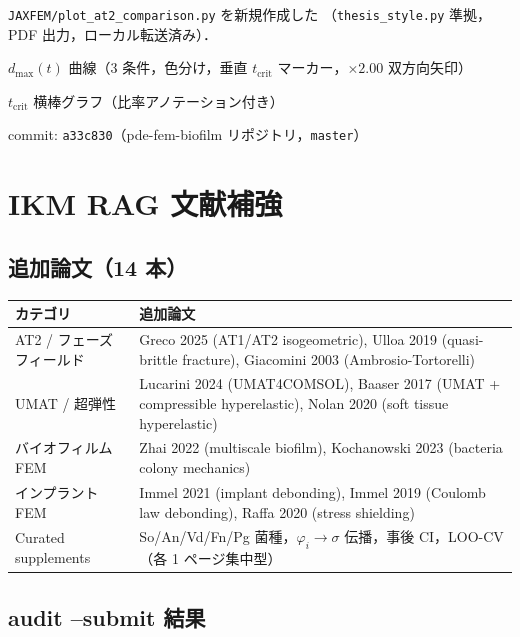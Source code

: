 \documentclass[12pt, a4paper]{article}
\begin{document}
\texttt{JAXFEM/plot\_at2\_comparison.py} を新規作成した
（\texttt{thesis\_style.py} 準拠，PDF 出力，ローカル転送済み）．

\begin{description}[leftmargin=2em, labelwidth=1.5em]
  \item[(a)] $d_\mathrm{max}(t)$ 曲線（3 条件，色分け，垂直 $t_\mathrm{crit}$ マーカー，$\times 2.00$ 双方向矢印）
  \item[(b)] $t_\mathrm{crit}$ 横棒グラフ（比率アノテーション付き）
\end{description}

\noindent
commit: \texttt{a33c830}（pde-fem-biofilm リポジトリ，\texttt{master}）

\section{IKM RAG 文献補強}

\subsection{追加論文（14 本）}

\begin{center}
\small
\begin{tabular}{lp{10cm}}
\toprule
カテゴリ & 追加論文 \\
\midrule
AT2 / フェーズフィールド &
  Greco 2025 (AT1/AT2 isogeometric),
  Ulloa 2019 (quasi-brittle fracture),
  Giacomini 2003 (Ambrosio-Tortorelli) \\
UMAT / 超弾性 &
  Lucarini 2024 (UMAT4COMSOL),
  Baaser 2017 (UMAT + compressible hyperelastic),
  Nolan 2020 (soft tissue hyperelastic) \\
バイオフィルム FEM &
  Zhai 2022 (multiscale biofilm),
  Kochanowski 2023 (bacteria colony mechanics) \\
インプラント FEM &
  Immel 2021 (implant debonding),
  Immel 2019 (Coulomb law debonding),
  Raffa 2020 (stress shielding) \\
Curated supplements &
  So/An/Vd/Fn/Pg 菌種，$\varphi_i \to \sigma$ 伝播，事後 CI，LOO-CV（各 1 ページ集中型） \\
\bottomrule
\end{tabular}
\end{center}

\subsection{audit --submit 結果}
\end{document}
